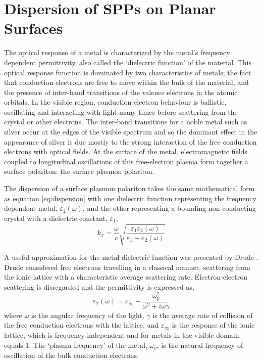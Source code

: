 \section{Dispersion of SPPs on Planar Surfaces\label{sec:SPPs}}

The optical response of a metal is characterized by the metal's frequency dependent permittivity, also called the `dielectric function' of the material. This optical response function is dominated by two characteristics of metals; the fact that conduction electrons are free to move within the bulk of the material, and the presence of inter-band transitions of the valence electrons in the atomic orbitals. In the visible region, conduction electron behaviour is ballistic, oscillating and interacting with light many times before scattering from the crystal or other electrons. The inter-band transitions for a noble metal such as silver occur at the edges of the visible spectrum and so the dominant effect in the appearance of silver is due mostly to the strong interaction of the free conduction electrons with optical fields. At the surface of the metal, electromagnetic fields coupled to longitudinal oscillations of this free-electron plasma form together a surface polariton: the surface plasmon polariton.

The dispersion of a surface plasmon polariton takes the same mathematical form as equation \ref{eq:dispersion} with one dielectric function representing the frequency dependent metal, $\varepsilon_2(\omega)$, and the other representing a bounding non-conducting crystal with a dielectric constant, $\varepsilon_1,$
\begin{equation}
k_x=\frac{\omega}{c}\sqrt{\frac{\varepsilon_1\varepsilon_2(\omega)}{\varepsilon_1+\varepsilon_2(\omega)}}\label{eq:spp-dispersion}
\end{equation}

A useful approximation for the metal dielectric function was presented by Drude \cite{kittel1996introduction}. Drude considered free electrons travelling in a classical manner, scattering from the ionic lattice with a characteristic average scattering rate. Electron-electron scattering is disregarded and the permittivity is expressed as,
\begin{equation}
\varepsilon_2(\omega)=\varepsilon_\infty-\frac{\omega_p^2}{\omega^2+i\omega\gamma}\label{eq:drude}
\end{equation}
where $\omega$ is the angular frequency of the light, $\gamma$ is the average rate of collision of the free conduction electrons with the lattice, and $\varepsilon_\infty$ is the response of the ionic lattice, which is frequency independent and for metals in the visible domain equals 1. The `plasma frequency' of the metal, $\omega_p$, is the natural frequency of oscillation of the bulk conduction electrons.

